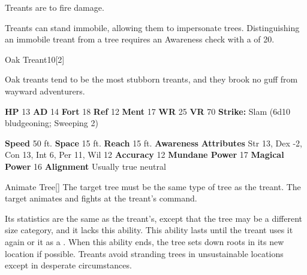         Treants are  to fire damage.
      
        Treants can stand immobile, allowing them to impersonate trees.
        Distinguishing an immobile treant from a tree requires an Awareness check with a  of 20.
  

  \begin{monsubsection}{Oak Treant}{10}[2]
    \vspace{-1em}\vspace{-1em}
    \vspace{0em}

    
          Oak treants tend to be the most stubborn treants, and they brook no guff from wayward adventurers.
        

    \begin{spellcontent}
      \begin{spelltargetinginfo}
        \pari \textbf{HP} 13 \monsep
          \textbf{AD} 14 \monsep
          \textbf{Fort} 18 \monsep
          \textbf{Ref} 12 \monsep
          \textbf{Ment} 17
        \pari \textbf{WR} 25 \monsep
        \textbf{VR} 70
        \pari \textbf{Strike:}
            Slam  (6d10 bludgeoning; Sweeping 2)
      \end{spelltargetinginfo}
    \end{spellcontent}
    \begin{monsterfooter}
      \pari \textbf{Speed} 50 ft. \monsep
        \textbf{Space} 15 ft. \monsep
        \textbf{Reach} 15 ft.
      \pari \textbf{Awareness} 
      \pari \textbf{Attributes}
        Str 13, Dex -2,
        Con 13, Int 6,
        Per 11, Wil 12
      \pari \textbf{Accuracy} 12 \monsep
        \textbf{Mundane Power} 17 \monsep
      \textbf{Magical Power} 16
      \pari \textbf{Alignment} Usually true neutral
    \end{monsterfooter}
  \end{monsubsection}
  \begin{freeability}{Animate Tree}[]
      The target tree must be the same type of tree as the treant.
        The target animates and fights at the treant's command.

        Its statistics are the same as the treant's, except that the tree may be a different size category, and it lacks this ability.
        This ability lasts until the treant uses it again or  it as a .
        When this ability ends, the tree sets down roots in its new location if possible.
        Treants avoid stranding trees in unsustainable locations except in desperate circumstances.
    \end{freeability}
  
